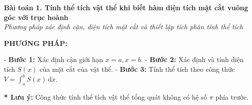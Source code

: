 \documentclass[12pt,a4paper]{article}
\newenvironment{lesson}[2]{
	\vspace{1em}\noindent\textbf{\Large #1}\\
	\textit{#2}\vspace{0.5em}
}{}
\begin{document}

\begin{lesson}{Bài toán 1. Tính thể tích vật thể khi biết hàm diện tích mặt cắt vuông góc với trục hoành}{Phương pháp xác định cận, diện tích mặt cắt và thiết lập tích phân tính thể tích}

\textbf{PHƯƠNG PHÁP:}

- \textbf{Bước 1:} Xác định cận giới hạn $x = a, x = b$.
- \textbf{Bước 2:} Xác định và tính diện tích $S(x)$ của mặt cắt của vật thể.
- \textbf{Bước 3:} Tính thể tích theo công thức $V = \int_a^b S(x)\,\mathrm{d}x$.

\textbf{* Lưu ý:} Công thức tính thể tích vật thể tổng quát không có hệ số $\pi$ phía trước.

\end{lesson}
\end{document}
